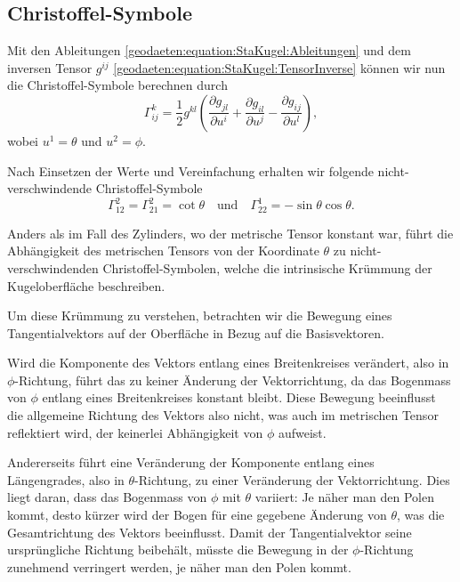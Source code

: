 \subsection{Christoffel-Symbole}
Mit den Ableitungen \eqref{geodaeten:equation:StaKugel:Ableitungen} und dem inversen Tensor $g^{ij}$ \eqref{geodaeten:equation:StaKugel:TensorInverse} können wir nun die Christoffel-Symbole berechnen durch
\begin{equation}
	\Gamma_{ij}^k = \frac{1}{2} g^{kl} \left( \frac{\partial g_{jl}}{\partial u^i} + \frac{\partial g_{il}}{\partial u^j} - \frac{\partial g_{ij}}{\partial u^l} \right),
\end{equation}
wobei $u^1 = \theta$ und $u^2 = \phi$.

Nach Einsetzen der Werte und Vereinfachung erhalten wir folgende nicht-verschwindende Christoffel-Symbole
\begin{equation}
	\Gamma_{12}^2 = \Gamma_{21}^2 = \cot\theta \quad \text{und} \quad \Gamma_{22}^1 = -\sin\theta \cos\theta.
\end{equation}

Anders als im Fall des Zylinders, wo der metrische Tensor konstant war, führt die Abhängigkeit des metrischen Tensors von der Koordinate $\theta$ zu nicht-verschwindenden Christoffel-Symbolen, welche die intrinsische Krümmung der Kugeloberfläche beschreiben.

Um diese Krümmung zu verstehen, betrachten wir die Bewegung eines Tangentialvektors auf der Oberfläche in Bezug auf die Basisvektoren.

Wird die Komponente des Vektors entlang eines Breitenkreises verändert, also in $\phi$-Richtung, führt das zu keiner Änderung der Vektorrichtung, da das Bogenmass von $\phi$ entlang eines Breitenkreises konstant bleibt.
Diese Bewegung beeinflusst die allgemeine Richtung des Vektors also nicht, was auch im metrischen Tensor reflektiert wird, der keinerlei Abhängigkeit von $\phi$ aufweist.

Andererseits führt eine Veränderung der Komponente entlang eines Längengrades, also in $\theta$-Richtung, zu einer Veränderung der Vektorrichtung.
Dies liegt daran, dass das Bogenmass von $\phi$ mit $\theta$ variiert: 
Je näher man den Polen kommt, desto kürzer wird der Bogen für eine gegebene Änderung von $\theta$, was die Gesamtrichtung des Vektors beeinflusst. 
Damit der Tangentialvektor seine ursprüngliche Richtung beibehält, müsste die Bewegung in der $\phi$-Richtung zunehmend verringert werden, je näher man den Polen kommt.


